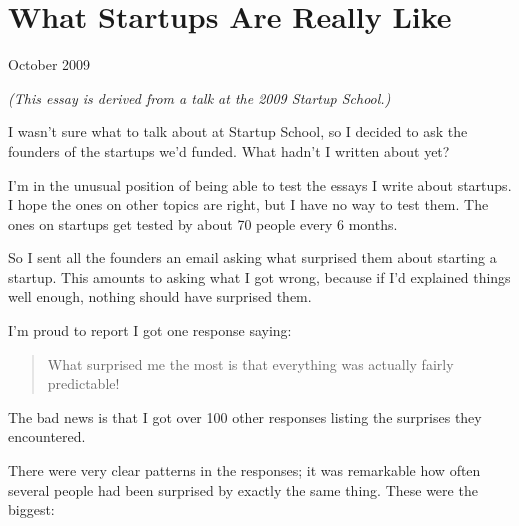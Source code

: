 \chapter{What Startups Are Really Like}


          
        
          


          
            
              
                


                  
                    October 2009

\emph{(This essay is derived from a talk at the 2009 Startup
                      School.)}

I wasn't sure what to talk about at Startup
                    School, so I decided to ask the founders of the startups
                    we'd funded. What hadn't I written about yet?

I'm
                    in the unusual position of being able to test the essays I
                    write about startups. I hope the ones on other topics are
                    right, but I have no way to test them. The ones on startups
                    get tested by about 70 people every 6 months.

So
                    I sent all the founders an email asking what surprised them
                    about starting a startup. This amounts to asking what I got
                    wrong, because if I'd explained things well enough, nothing
                    should have surprised them.

I'm proud to report I
                    got one response saying:
                  


                  \begin{quote}

                    What surprised me the most is that everything was actually
                    fairly predictable!
                  
\end{quote}

                  The bad news is that I got over 100 other responses listing
                  the surprises they encountered.

There were very
                  clear patterns in the responses; it was remarkable how often
                  several people had been surprised by exactly the same thing.
                  These were the biggest:


